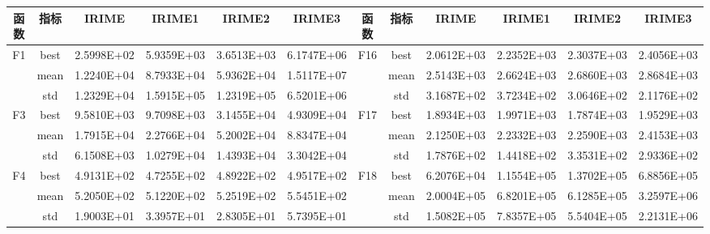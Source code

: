 \documentclass{wzuthesis}
\begin{document}
\begin{table}[htbp]
  \centering
  \footnotesize
    \setlength{\tabcolsep}{3pt}
    \begin{tabular}{rrrrrrccrrrr}
    \toprule
    \multicolumn{1}{c}{函数} & \multicolumn{1}{c}{指标} & \multicolumn{1}{c}{IRIME} & \multicolumn{1}{c}{IRIME1} & \multicolumn{1}{c}{IRIME2} & \multicolumn{1}{c}{IRIME3} & 函数 & 指标 & \multicolumn{1}{c}{IRIME} & \multicolumn{1}{c}{IRIME1} & \multicolumn{1}{c}{IRIME2} & \multicolumn{1}{c}{IRIME3} \\
    \midrule
    \multicolumn{1}{c}{\multirow{3}[0]{*}{F1}} & \multicolumn{1}{c}{best} & 2.5998E+02 & 5.9359E+03 & 3.6513E+03 & 6.1747E+06 & \multirow{3}[0]{*}{F16} & best  & 2.0612E+03 & 2.2352E+03 & 2.3037E+03 & 2.4056E+03 \\
          & \multicolumn{1}{c}{mean} & 1.2240E+04 & 8.7933E+04 & 5.9362E+04 & 1.5117E+07 &       & mean  & 2.5143E+03 & 2.6624E+03 & 2.6860E+03 & 2.8684E+03 \\
          & \multicolumn{1}{c}{std} & 1.2329E+04 & 1.5915E+05 & 1.2319E+05 & 6.5201E+06 &       & std   & 3.1687E+02 & 3.7234E+02 & 3.0646E+02 & 2.1176E+02 \\
    \multicolumn{1}{c}{\multirow{3}[0]{*}{F3}} & \multicolumn{1}{c}{best} & 9.5810E+03 & 9.7098E+03 & 3.1455E+04 & 4.9309E+04 & \multirow{3}[0]{*}{F17} & best  & 1.8934E+03 & 1.9971E+03 & 1.7874E+03 & 1.9529E+03 \\
          & \multicolumn{1}{c}{mean} & 1.7915E+04 & 2.2766E+04 & 5.2002E+04 & 8.8347E+04 &       & mean  & 2.1250E+03 & 2.2332E+03 & 2.2590E+03 & 2.4153E+03 \\
          & \multicolumn{1}{c}{std} & 6.1508E+03 & 1.0279E+04 & 1.4393E+04 & 3.3042E+04 &       & std   & 1.7876E+02 & 1.4418E+02 & 3.3531E+02 & 2.9336E+02 \\
    \multicolumn{1}{c}{\multirow{3}[0]{*}{F4}} & \multicolumn{1}{c}{best} & 4.9131E+02 & 4.7255E+02 & 4.8922E+02 & 4.9517E+02 & \multirow{3}[0]{*}{F18} & best  & 6.2076E+04 & 1.1554E+05 & 1.3702E+05 & 6.8856E+05 \\
          & \multicolumn{1}{c}{mean} & 5.2050E+02 & 5.1220E+02 & 5.2519E+02 & 5.5451E+02 &       & mean  & 2.0004E+05 & 6.8201E+05 & 6.1285E+05 & 3.2597E+06 \\
          & \multicolumn{1}{c}{std} & 1.9003E+01 & 3.3957E+01 & 2.8305E+01 & 5.7395E+01 &       & std   & 1.5082E+05 & 7.8357E+05 & 5.5404E+05 & 2.2131E+06 \\

\end{tabular}
\end{table}
\end{document}
